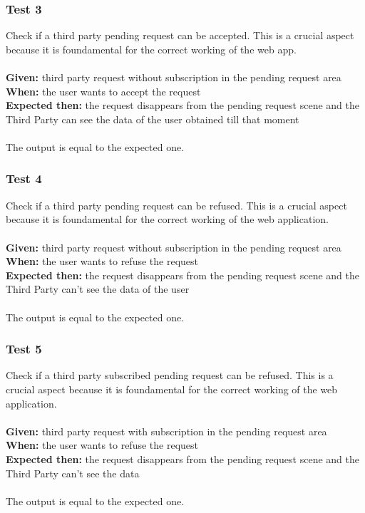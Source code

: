 \subsubsection{\Large{Test 3}}
Check if a third party pending request can be accepted. This is a crucial aspect because it is foundamental for the correct working of the web app.\\
\\
\textbf{Given: }  third party request without subscription in the pending request area\\
\textbf{When: } the user wants to accept the request\\
\textbf{Expected then: } the request disappears from the pending request scene and the Third Party can see the data of the user obtained till that moment \\
\\
The output is equal to the expected one.

\subsubsection{\Large{Test 4}}
Check if a third party pending request can be refused. This is a crucial aspect because it is foundamental for the correct working of the web application.\\
\\
\textbf{Given: }  third party request without subscription in the pending request area\\
\textbf{When: } the user wants to refuse the request\\
\textbf{Expected then: } the request disappears from the pending request scene and the Third Party can't see the data of the user  \\
\\
The output is equal to the expected one.

\subsubsection{\Large{Test 5}}
Check if a third party subscribed pending request can be refused. This is a crucial aspect because it is foundamental for the correct working of the web application.\\
\\
\textbf{Given: }  third party request with subscription in the pending request area\\
\textbf{When: } the user wants to refuse the request\\
\textbf{Expected then: } the request disappears from the pending request scene and the Third Party can't see the data\\
\\
The output is equal to the expected one.

